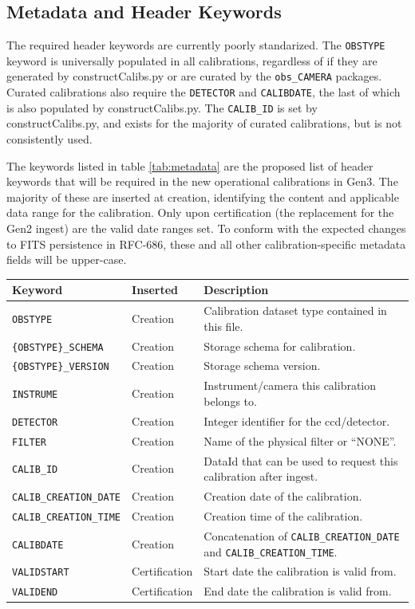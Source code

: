 \documentclass[DM,authoryear,toc]{lsstdoc}
\begin{document}
\subsection{Metadata and Header Keywords}

The required header keywords are currently poorly standarized.  The
\verb|OBSTYPE| keyword is universally populated in all calibrations,
regardless of if they are generated by constructCalibs.py or are
curated by the \verb|obs_CAMERA| packages.  Curated calibrations also
require the \verb|DETECTOR| and \verb|CALIBDATE|, the last of which is
also populated by constructCalibs.py.  The \verb|CALIB_ID| is set by
constructCalibs.py, and exists for the majority of curated
calibrations, but is not consistently used.

The keywords listed in table \ref{tab:metadata} are the proposed list
of header keywords that will be required in the new operational
calibrations in Gen3.  The majority of these are inserted at creation,
identifying the content and applicable data range for the calibration.
Only upon certification (the replacement for the Gen2 ingest) are the
valid date ranges set.  To conform with the expected changes to FITS
persistence in RFC-686, these and all other calibration-specific
metadata fields will be upper-case.

\begin{tabular}{l l l}
  \label{tab:metadata}
  Keyword & Inserted & Description \\
  \hline
  \verb|OBSTYPE| & Creation & Calibration dataset type contained in this file. \\
  \verb|{OBSTYPE}_SCHEMA| & Creation & Storage schema for calibration.  \\
  \verb|{OBSTYPE}_VERSION| & Creation & Storage schema version. \\
  \verb|INSTRUME| & Creation & Instrument/camera this calibration belongs to. \\
  \verb|DETECTOR| & Creation & Integer identifier for the ccd/detector. \\
  \verb|FILTER| & Creation & Name of the physical filter or ``NONE''. \\
  \verb|CALIB_ID| & Creation & DataId that can be used to request this calibration after ingest. \\
  \verb|CALIB_CREATION_DATE| & Creation & Creation date of the calibration. \\
  \verb|CALIB_CREATION_TIME| & Creation & Creation time of the calibration. \\
  \verb|CALIBDATE| & Creation & Concatenation of \verb|CALIB_CREATION_DATE| and \verb|CALIB_CREATION_TIME|. \\
  \verb|VALIDSTART| & Certification & Start date the calibration is valid from.  \\
  \verb|VALIDEND| & Certification & End date the calibration is valid from.  \\
\end{tabular}
\end{document}
